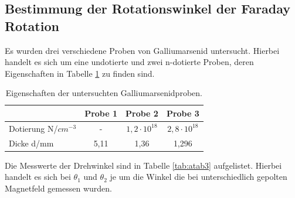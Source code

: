 \subsection{Bestimmung der Rotationswinkel der Faraday Rotation}
Es wurden drei verschiedene Proben von Galliumarsenid untersucht. Hierbei handelt es sich um eine undotierte und zwei n-dotierte Proben, deren Eigenschaften in Tabelle \ref{tab:atab2} zu finden sind.

\FloatBarrier
\begin{table}[h]
    \centering
    \caption{Eigenschaften der untersuchten Galliumarsenidproben.}
    \label{tab:atab2}
    \begin{tabular}{l c c c}
        \toprule
        {} & {Probe 1} & {Probe 2} & {Probe 3} \\
        \midrule
        Dotierung N/$cm^{-3}$ & - & $1,2 \cdot 10^{18}$ & $2,8 \cdot 10^{18}$ \\
        Dicke d/mm & 5,11 & 1,36 & 1,296 \\
        \bottomrule
    \end{tabular}
\end{table}
\FloatBarrier
\noindent


Die Messwerte der Drehwinkel sind in Tabelle \ref{tab:atab3} aufgelistet. Hierbei handelt es sich bei $\theta_1$ und $\theta_2$ je um die Winkel die bei unterschiedlich gepolten Magnetfeld gemessen wurden.

